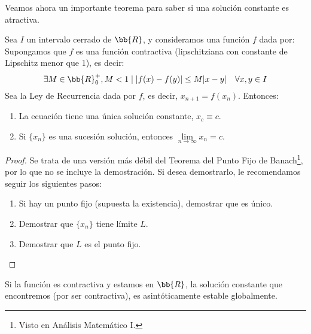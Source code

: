 Veamos ahora un importante teorema para saber si una solución constante es atractiva.
\begin{teo}
Sea $I$ un intervalo cerrado de $\bb{R}$, y consideramos una función $f$ dada por:
   Supongamos que $f$ es una función contractiva (lipschitziana con constante de Lipschitz menor que 1), es decir:
    \begin{equation*}
        \exists M \in \bb{R}^+_0, M < 1 \mid |f(x)-f(y)|\leq M|x-y|\quad \forall x,y \in I
    \end{equation*}
    Sea la Ley de Recurrencia dada por $f$, es decir, $x_{n+1} = f(x_n)$. Entonces:
    \begin{enumerate}
        \item La ecuación tiene una única solución constante, $x_c \equiv c$.
        \item Si $\{x_n\}$ es una sucesión solución, entonces $\lim\limits_{n \to \infty}x_n = c$.
    \end{enumerate}
\end{teo}
\begin{proof}
    Se trata de una versión más débil del Teorema del Punto Fijo de Banach\footnote{Visto en Análisis Matemático I.}, por lo que no se incluye la demostración. Si desea demostrarlo, le recomendamos seguir los siguientes pasos:
    \begin{enumerate}
        \item Si hay un punto fijo (supuesta la existencia), demostrar que es único.
        \item Demostrar que $\{x_n\}$ tiene límite $L$.
        \item Demostrar que $L$ es el punto fijo.
    \end{enumerate}
\end{proof}

\begin{prop}
    Si la función es contractiva y estamos en $\bb{R}$, la solución constante que encontremos (por ser contractiva), es asintóticamente estable globalmente.

\end{prop}

